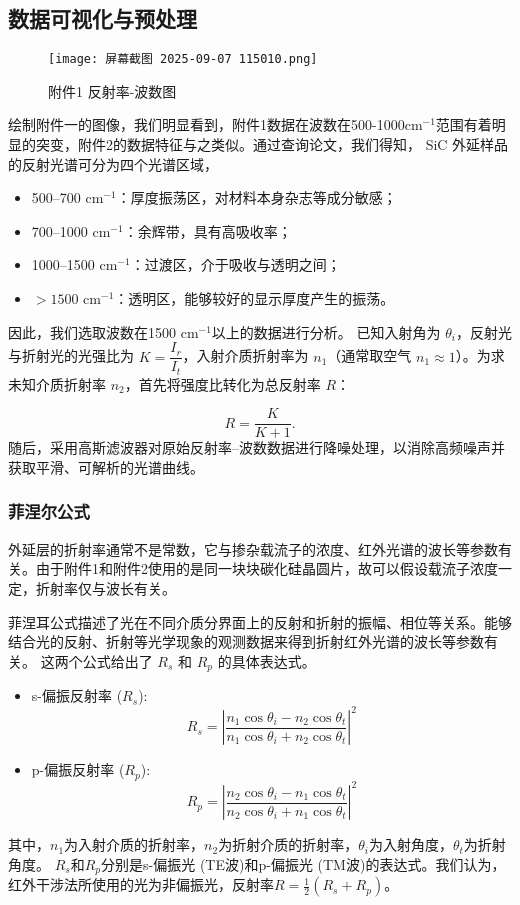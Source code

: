 \documentclass[withoutpreface,bwprint]{cumcmthesis}
\begin{document}
	\subsection{数据可视化与预处理}
	\begin{figure}[H]
	\centering
	\texttt{[image: 屏幕截图 2025-09-07 115010.png]}
	\caption{附件1 反射率-波数图}
	\label{fig:refraction_process}
	\end{figure}
	绘制附件一的图像，我们明显看到，附件1数据在波数在500-1000cm$^{-1}$范围有着明显的突变，附件2的数据特征与之类似。通过查询论文，我们得知， SiC 外延样品的反射光谱可分为四个光谱区域，

	\begin{itemize}
  \item 500–700 cm$^{-1}$：厚度振荡区，对材料本身杂志等成分敏感；
  \item 700–1000 cm$^{-1}$：余辉带，具有高吸收率；
  \item 1000–1500 cm$^{-1}$：过渡区，介于吸收与透明之间；
  \item $>1500$ cm$^{-1}$：透明区，能够较好的显示厚度产生的振荡。
\end{itemize}
	因此，我们选取波数在1500 cm$^{-1}$以上的数据进行分析。
已知入射角为 $\theta_i$，反射光与折射光的光强比为 $K=\dfrac{I_r}{I_t}$，入射介质折射率为 $n_1$（通常取空气 $n_1\approx 1$）。为求未知介质折射率 $n_2$，首先将强度比转化为总反射率 $R$：

\begin{equation}
R=\frac{K}{K+1}.
\end{equation}
随后，采用高斯滤波器对原始反射率–波数数据进行降噪处理，以消除高频噪声并获取平滑、可解析的光谱曲线。
\subsubsection{菲涅尔公式}
	外延层的折射率通常不是常数，它与掺杂载流子的浓度、红外光谱的波长等参数有关。由于附件1和附件2使用的是同一块块碳化硅晶圆片，故可以假设载流子浓度一定，折射率仅与波长有关。
	
	菲涅耳公式描述了光在不同介质分界面上的反射和折射的振幅、相位等关系。能够结合光的反射、折射等光学现象的观测数据来得到折射红外光谱的波长等参数有关。
	这两个公式给出了 $R_s$ 和 $R_p$ 的具体表达式。

\begin{itemize}
    \item s-偏振反射率 ($R_s$):
    \[
    R_s = \left| \frac{n_1 \cos \theta_i - n_2 \cos \theta_t}{n_1 \cos \theta_i + n_2 \cos \theta_t} \right|^2
    \]
    
    \item p-偏振反射率 ($R_p$):
    \[
    R_p = \left| \frac{n_2 \cos \theta_i - n_1 \cos \theta_t}{n_2 \cos \theta_i + n_1 \cos \theta_t} \right|^2
    \]
\end{itemize}
其中，$n_1$为入射介质的折射率，$n_2$为折射介质的折射率，$\theta_i$为入射角度，$\theta_t$为折射角度。
$R_s$和$R_p$分别是s-偏振光 (TE波)和p-偏振光 (TM波)的表达式。我们认为，红外干涉法所使用的光为非偏振光，反射率$R = \frac{1}{2}(R_s + R_p)$。
\end{document}
